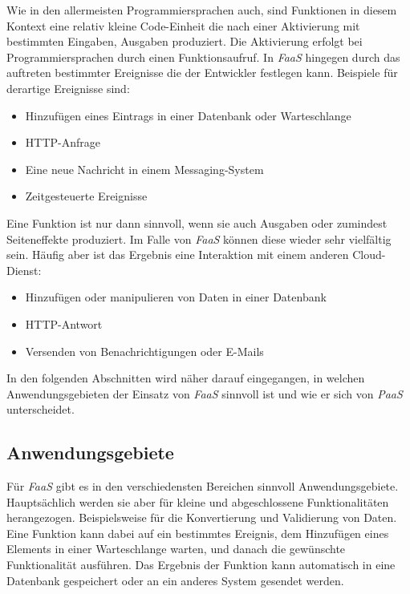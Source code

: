 Wie in den allermeisten Programmiersprachen auch, sind Funktionen in diesem Kontext eine relativ kleine Code-Einheit die nach einer Aktivierung mit bestimmten Eingaben, Ausgaben produziert. Die Aktivierung erfolgt bei Programmiersprachen durch einen Funktionsaufruf. In \textit{FaaS} hingegen durch das auftreten bestimmter Ereignisse die der Entwickler festlegen kann. Beispiele für derartige Ereignisse sind:

\begin{itemize}
	\item Hinzufügen eines Eintrags in einer Datenbank oder Warteschlange
	\item HTTP-Anfrage
	\item Eine neue Nachricht in einem Messaging-System
	\item Zeitgesteuerte Ereignisse
\end{itemize}

Eine Funktion ist nur dann sinnvoll, wenn sie auch Ausgaben oder zumindest Seiteneffekte produziert. Im Falle von \textit{FaaS} können diese wieder sehr vielfältig sein. Häufig aber ist das Ergebnis eine Interaktion mit einem anderen Cloud-Dienst:

\begin{itemize}
	\item Hinzufügen oder manipulieren von Daten in einer Datenbank
	\item HTTP-Antwort
	\item Versenden von Benachrichtigungen oder E-Mails
\end{itemize}

In den folgenden Abschnitten wird näher darauf eingegangen, in welchen Anwendungsgebieten der Einsatz von \textit{FaaS} sinnvoll ist und wie er sich von \textit{PaaS} unterscheidet.


\subsection{Anwendungsgebiete}

Für \textit{FaaS} gibt es in den verschiedensten Bereichen sinnvoll Anwendungsgebiete. Hauptsächlich werden sie aber für kleine und abgeschlossene Funktionalitäten herangezogen. Beispielsweise für die Konvertierung und Validierung von Daten. Eine Funktion kann dabei auf ein bestimmtes Ereignis, \zB dem Hinzufügen eines Elements in einer Warteschlange warten, und danach die gewünschte Funktionalität ausführen. Das Ergebnis der Funktion kann \zB automatisch in eine Datenbank gespeichert oder an ein anderes System gesendet werden.

